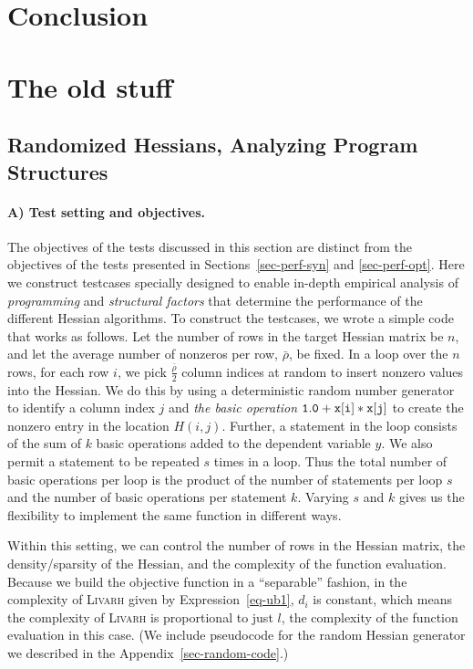 \documentclass[12pt]{article}
\begin{document}
\section*{Conclusion}

\newpage

\appendix
\section{The old stuff}
\subsection{Randomized Hessians, Analyzing Program Structures}
\label{sec-perf-rand}

\label{sec-perf-random}

\paragraph{A) Test setting and objectives.}
The objectives of the tests discussed in this section are distinct from
the objectives of the tests presented in Sections~\ref{sec-perf-syn} and \ref{sec-perf-opt}.
Here we construct testcases specially designed to enable in-depth
empirical analysis of {\em programming} and {\em structural factors} that 
determine the performance of the  different Hessian algorithms. 
To construct the testcases, we wrote a simple code that works as follows. 
Let the number of rows in the target Hessian matrix be $n$, and
let the average number of nonzeros per row, $\bar{\rho}$, be fixed.
In a loop over the $n$ rows, for each row $i$, 
we pick $\frac{\bar{\rho}}{2}$ column indices at random to insert nonzero values into the Hessian.    
We do this by using a deterministic random number generator to identify a column index $j$ and {\em the basic operation} 
$\tt 1.0+x[i]*x[j]$ to create the nonzero entry in the location $H(i,j)$. 
Further, a statement in the loop consists of the sum of $k$ basic operations added to the dependent variable $y$. We also permit a statement to be repeated $s$ times in a loop. Thus the total number of basic operations per loop is the product of the number of statements per loop $s$ and the number of basic operations per statement $k$. Varying $s$ and $k$ gives us the flexibility to implement the same function in different ways.

Within this setting, we can control the number of rows in the Hessian matrix, the density/sparsity of the Hessian, and the complexity of the function evaluation. Because we build
the objective function in a ``separable'' fashion, in the complexity of 
\textsc{Livarh} given by Expression~\eqref{eq-ub1}, $d_i$ is constant, which means the complexity of \textsc{Livarh} is proportional to just $l$, the complexity of the function 
evaluation in this case.
(We include pseudocode for the random Hessian generator we described in the Appendix~\ref{sec-random-code}.)   
\end{document}
